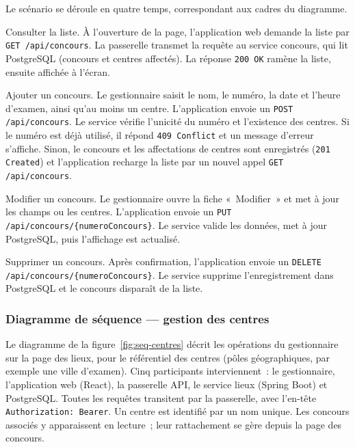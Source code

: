 \begin{onehalfspace}

Le scénario se déroule en quatre temps, correspondant aux cadres du diagramme.

Consulter la liste. À l'ouverture de la page, l'application web demande la liste par \texttt{GET /api/concours}. La passerelle transmet la requête au service concours, qui lit PostgreSQL (concours et centres affectés). La réponse \texttt{200 OK} ramène la liste, ensuite affichée à l'écran.

Ajouter un concours. Le gestionnaire saisit le nom, le numéro, la date et l'heure d'examen, ainsi qu'au moins un centre. L'application envoie un \texttt{POST /api/concours}. Le service vérifie l'unicité du numéro et l'existence des centres. Si le numéro est déjà utilisé, il répond \texttt{409 Conflict} et un message d'erreur s'affiche. Sinon, le concours et les affectations de centres sont enregistrés (\texttt{201 Created}) et l'application recharge la liste par un nouvel appel \texttt{GET /api/concours}.

Modifier un concours. Le gestionnaire ouvre la fiche «~Modifier~» et met à jour les champs ou les centres. L'application envoie un \texttt{PUT /api/concours/\{numeroConcours\}}. Le service valide les données, met à jour PostgreSQL, puis l'affichage est actualisé.

Supprimer un concours. Après confirmation, l'application envoie un \texttt{DELETE /api/concours/\{numeroConcours\}}. Le service supprime l'enregistrement dans PostgreSQL et le concours disparaît de la liste.

\subsubsection{Diagramme de séquence --- gestion des centres}

Le diagramme de la figure~\ref{fig:seq-centres} décrit les opérations du gestionnaire sur la page des lieux, pour le référentiel des centres (pôles géographiques, par exemple une ville d'examen). Cinq participants interviennent~: le gestionnaire, l'application web (React), la passerelle API, le service lieux (Spring Boot) et PostgreSQL. Toutes les requêtes transitent par la passerelle, avec l'en-tête \texttt{Authorization: Bearer}. Un centre est identifié par un nom unique. Les concours associés y apparaissent en lecture~; leur rattachement se gère depuis la page des concours.



\end{onehalfspace}

